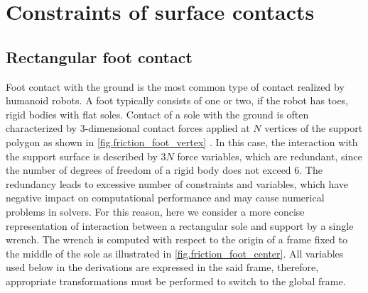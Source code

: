 \chapter{Constraints of surface contacts}
\label{app.surface_contacts}
\acresetall


\section{Rectangular foot contact}\label{sec.rectangular_foot}

Foot contact with the ground is the most common type of contact realized by
humanoid robots. A foot typically consists of one or two, if the robot has toes,
rigid bodies with flat soles. Contact of a sole with the ground is often
characterized by 3-dimensional contact forces applied at $N$ vertices of the
support polygon as shown in \cref{fig.friction_foot_vertex}
\cite{Kuindersma2014icra, Abe2007siggraph, Ott2011humanoids, Hauser2008ijrr}.
In this case, the interaction with the support surface is described by $3N$
force variables, which are redundant, since the number of degrees of freedom of
a rigid body does not exceed $6$. The redundancy leads to excessive number of
constraints and variables, which have negative impact on computational
performance and may cause numerical problems in solvers. For this reason, here
we consider a more concise representation of interaction between a rectangular
sole and support by a single wrench. The wrench is computed with respect to the
origin of a frame fixed to the middle of the sole as illustrated in
\cref{fig.friction_foot_center}. All variables used below in the derivations
are expressed in the said frame, therefore, appropriate transformations must be
performed to switch to the global frame.


